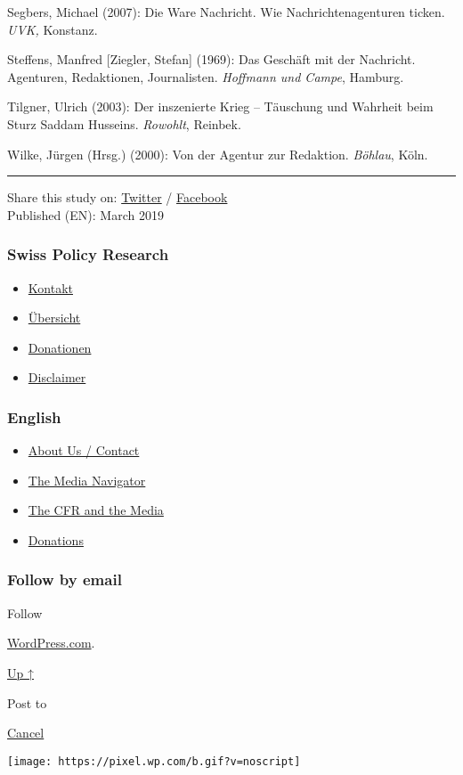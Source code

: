 Segbers, Michael (2007): Die Ware Nachricht. Wie Nachrichtenagenturen
ticken. \emph{UVK,} Konstanz.

Steffens, Manfred {[}Ziegler, Stefan{]} (1969): Das Geschäft mit der
Nachricht. Agenturen, Redaktionen, Journalisten. \emph{Hoffmann und
Campe}, Hamburg.

Tilgner, Ulrich (2003): Der inszenierte Krieg -- Täuschung und Wahrheit
beim Sturz Saddam Husseins. \emph{Rowohlt}, Reinbek.

Wilke, Jürgen (Hrsg.) (2000): Von der Agentur zur Redaktion.
\emph{Böhlau}, Köln.

\begin{center}\rule{0.5\linewidth}{\linethickness}\end{center}

Share this study on:
\href{https://twitter.com/intent/tweet?url=https://swprs.org/the-propaganda-multiplier/}{Twitter}
/
\href{https://www.facebook.com/share.php?u=https://swprs.org/the-propaganda-multiplier/}{Facebook}\\
Published (EN): March 2019

\hypertarget{swiss-policy-research}{%
\subsubsection{Swiss Policy Research}\label{swiss-policy-research}}

\begin{itemize}
\tightlist
\item
  \href{https://swprs.org/kontakt/}{Kontakt}
\item
  \href{https://swprs.org/uebersicht/}{Übersicht}
\item
  \href{https://swprs.org/donationen/}{Donationen}
\item
  \href{https://swprs.org/disclaimer/}{Disclaimer}
\end{itemize}

\hypertarget{english}{%
\subsubsection{English}\label{english}}

\begin{itemize}
\tightlist
\item
  \href{https://swprs.org/contact/}{About Us / Contact}
\item
  \href{https://swprs.org/media-navigator/}{The Media Navigator}
\item
  \href{https://swprs.org/the-american-empire-and-its-media/}{The CFR
  and the Media}
\item
  \href{https://swprs.org/donations/}{Donations}
\end{itemize}

\hypertarget{follow-by-email}{%
\subsubsection{Follow by email}\label{follow-by-email}}

Follow

\href{https://wordpress.com/?ref=footer_custom_com}{WordPress.com}.

\protect\hyperlink{}{Up ↑}

Post to

\protect\hyperlink{}{Cancel}

\texttt{[image: https://pixel.wp.com/b.gif?v=noscript]}
